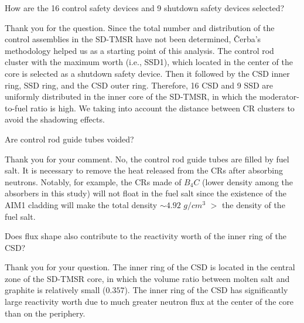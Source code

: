 \documentclass[answers,11pt]{exam}
\begin{document}
\begin{questions}
        \question  How are the 16 control safety devices and 9 shutdown safety devices selected?
        \begin{solution}
        	Thank you for the question. Since the total number and distribution of the control assemblies in the SD-TMSR have not been determined, \v{C}erba's methodology \cite{vcerba2017optimization} helped us as a starting point of this analysis. The control rod cluster with the maximum worth (i.e., SSD1), which located in the center of the core is selected as a shutdown safety device.
        	Then it followed by the CSD inner ring, SSD ring, and the CSD outer ring. Therefore, 16 CSD and 9 SSD are uniformly distributed in the inner core of the SD-TMSR, in which the moderator-to-fuel ratio is high. We taking into account the distance between CR clusters to avoid the shadowing effects.
        	

        \end{solution}

        \question Are control rod guide tubes voided?
        \begin{solution}
                Thank you for your comment. No, the control rod guide tubes are filled by fuel salt. It is necessary to remove the heat released from the CRs after absorbing neutrons. Notably, for example, the CRs made of $B_{4}C$ (lower density among the absorbers in this study) will not float in the fuel salt since the existence of the AIM1 cladding will make the total density $\sim 4.92$ $g/cm^3$ $>$ the density of the fuel salt.
                 
                
              
                
                
                

        \end{solution}

        \question Does flux shape also contribute to the reactivity worth of the inner ring of the CSD?
        \begin{solution}
                 Thank you for your question. The inner ring of the CSD is located in the central zone of the SD-TMSR core, in which the volume ratio between molten salt and graphite is relatively small ($0.357$). The inner ring of the CSD has significantly large reactivity worth due to much greater neutron flux at the center of the core than on the periphery.


\end{solution}
\end{questions}
\end{document}
